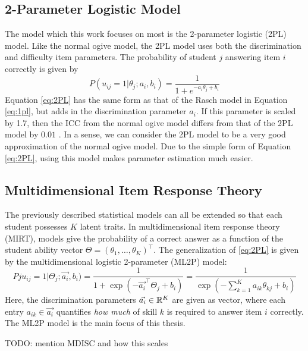 \subsection{2-Parameter Logistic Model}
The model which this work focuses on most is the 2-parameter logistic (2PL) model. Like the normal ogive model, the 2PL model uses both the discrimination and difficulty item parameters. The probability of student $j$ answering item $i$ correctly is given by
\begin{equation}
  P(u_{ij} = 1 | \theta_j; a_i, b_i) = \frac{1}{1 + e^{-a_i \theta_j + b_i}}
  \label{eq:2PL}
\end{equation}
Equation \ref{eq:2PL} has the same form as that of the Rasch model in Equation \ref{eq:1pl}, but adds in the discrimination parameter $a_i$. If this parameter is scaled by 1.7, then the ICC from the normal ogive model differs from that of the 2PL model by $0.01$ \cite{baker_kim2004}. In a sense, we can consider the 2PL model to be a very good approximation of the normal ogive model. Due to the simple form of Equation \ref{eq:2PL}, using this model makes parameter estimation much easier.

\subsection{Multidimensional Item Response Theory}
The previously described statistical models can all be extended so that each student possesses $K$ latent traits. In multidimensional item response theory (MIRT), models give the probability of a correct answer as a function of the student ability vector $\Theta = (\theta_1,\ldots, \theta_K)^\top$. The generalization of \ref{eq:2PL} is given by the multidimensional logistic 2-parameter (ML2P) model:
\begin{equation}
Pju_{ij} = 1 | \Theta_j; \vec{a_i}, b_i) = \frac{1}{1 + \exp\left(-\vec{a_i}^\top \Theta_j + b_i\right)} = \frac{1}{\exp\left(-\sum_{k=1}^K a_{ik} \theta_{kj} + b_i \right)}
  \label{eq:ml2p}
\end{equation}
Here, the discrimination parameters $\vec{a_i} \in \mathbb{R}^K$ are given as vector, where each entry $a_{ik} \in \vec{a_i}$ quantifies \textit{how much} of skill $k$ is required to answer item $i$ correctly. The ML2P model is the main focus of this thesis.

TODO: mention MDISC and how this scales

